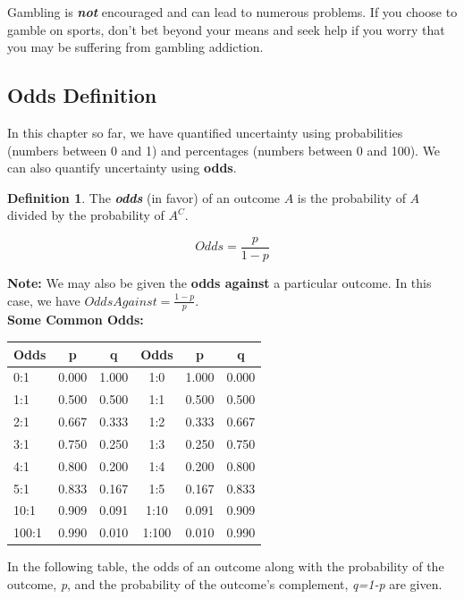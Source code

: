 \documentclass[
  11pt,
]{book}
\theoremstyle{definition}
\newtheorem{definition}{Definition}[chapter]
\theoremstyle{definition}
\theoremstyle{definition}
\theoremstyle{definition}
\theoremstyle{remark}
\begin{document}
Gambling is \textbf{\emph{not}} encouraged and can lead to numerous problems. If you choose to gamble on sports, don't bet beyond your means and seek help if you worry that you may be suffering from gambling addiction.

\hypertarget{odds-definition}{%
\subsection{Odds Definition}\label{odds-definition}}

In this chapter so far, we have quantified uncertainty using probabilities (numbers between 0 and 1) and percentages (numbers between 0 and 100). We can also quantify uncertainty using \textbf{odds}.

\begin{definition}
The \textbf{\emph{odds}} (in favor) of an outcome \(A\) is the probability of \(A\) divided by the probability of \(A^C\).

\[Odds = \frac{p}{1-p}\]
\end{definition}

\textbf{Note:} We may also be given the \textbf{odds against} a particular outcome. In this case, we have \(Odds Against = \frac{1-p}{p}\).\\

\textbf{Some Common Odds:}

\begin{table}[H]
\centering
\begin{tabular}{l|c|c|c|c|c}
\hline
Odds & p & q & Odds & p & q\\
\hline
0:1 & 0.000 & 1.000 & 1:0 & 1.000 & 0.000\\
\hline
1:1 & 0.500 & 0.500 & 1:1 & 0.500 & 0.500\\
\hline
2:1 & 0.667 & 0.333 & 1:2 & 0.333 & 0.667\\
\hline
3:1 & 0.750 & 0.250 & 1:3 & 0.250 & 0.750\\
\hline
4:1 & 0.800 & 0.200 & 1:4 & 0.200 & 0.800\\
\hline
5:1 & 0.833 & 0.167 & 1:5 & 0.167 & 0.833\\
\hline
10:1 & 0.909 & 0.091 & 1:10 & 0.091 & 0.909\\
\hline
100:1 & 0.990 & 0.010 & 1:100 & 0.010 & 0.990\\
\hline
\end{tabular}
\end{table}

In the following table, the odds of an outcome along with the probability of the outcome, \emph{p}, and the probability of the outcome's complement, \emph{q=1-p} are given.
\end{document}

